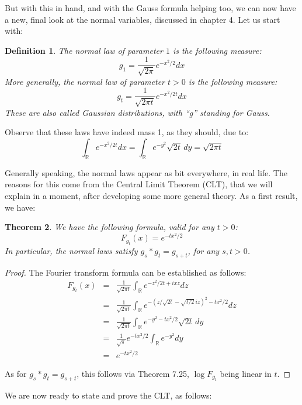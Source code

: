 \documentclass[12pt]{amsbook}
\newtheorem{theorem}{Theorem}[chapter]
\newtheorem{definition}[theorem]{Definition}
\begin{document}
But with this in hand, and with the Gauss formula helping too, we can now have a new, final look at the normal variables, discussed in chapter 4. Let us start with:

\begin{definition}
The normal law of parameter $1$ is the following measure:
$$g_1=\frac{1}{\sqrt{2\pi}}e^{-x^2/2}dx$$
More generally, the normal law of parameter $t>0$ is the following measure:
$$g_t=\frac{1}{\sqrt{2\pi t}}e^{-x^2/2t}dx$$
These are also called Gaussian distributions, with ``g'' standing for Gauss.
\end{definition}

Observe that these laws have indeed mass 1, as they should, due to:
$$\int_\mathbb R e^{-x^2/2t}dx
=\int_\mathbb R e^{-y^2}\sqrt{2t}\,dy
=\sqrt{2\pi t}$$

Generally speaking, the normal laws appear as bit everywhere, in real life. The reasons for this come from the Central Limit Theorem (CLT), that we will explain in a moment, after developing some more general theory. As a first result, we have:


\begin{theorem}
We have the following formula, valid for any $t>0$:
$$F_{g_t}(x)=e^{-tx^2/2}$$
In particular, the normal laws satisfy $g_s*g_t=g_{s+t}$, for any $s,t>0$.
\end{theorem}

\begin{proof}
The Fourier transform formula can be established as follows:
\begin{eqnarray*}
F_{g_t}(x)
&=&\frac{1}{\sqrt{2\pi t}}\int_\mathbb Re^{-z^2/2t+ixz}dz\\
&=&\frac{1}{\sqrt{2\pi t}}\int_\mathbb Re^{-(z/\sqrt{2t}-\sqrt{t/2}\,iz)^2-tx^2/2}dz\\
&=&\frac{1}{\sqrt{2\pi t}}\int_\mathbb Re^{-y^2-tx^2/2}\sqrt{2t}\,dy\\
&=&\frac{1}{\sqrt{\pi}}e^{-tx^2/2}\int_\mathbb Re^{-y^2}dy\\
&=&e^{-tx^2/2}
\end{eqnarray*}

As for $g_s*g_t=g_{s+t}$, this follows via Theorem 7.25, $\log F_{g_t}$ being linear in $t$.
\end{proof}

We are now ready to state and prove the CLT, as follows:

\end{document}
